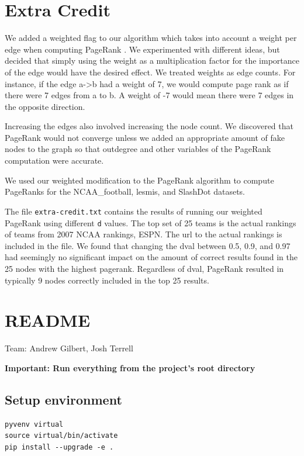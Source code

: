 \documentclass{report}
\newcommand{\pagerank}{PageRank }
\newcommand{\pageranks}{PageRanks }
\begin{document}
\section{Extra Credit}
We added a weighted flag to our algorithm which takes into account a weight per
edge when computing \pagerank. We experimented with different ideas, but decided
that simply using the weight as a multiplication factor for the importance of
the edge would have the desired effect. We treated weights as edge counts.  For
instance, if the edge a->b had a weight of 7, we would compute page rank as if
there were 7 edges from a to b. A weight of -7 would mean there were 7 edges in
the opposite direction.

Increasing the edges also involved increasing the node count. We discovered that
\pagerank would not converge unless we added an appropriate amount of fake nodes
to the graph so that outdegree and other variables of the \pagerank computation
were accurate.

We used our weighted modification to the \pagerank algorithm to compute \pageranks
for the NCAA\_football, lesmis, and SlashDot datasets.

The file \texttt{extra-credit.txt} contains the results of running our weighted
\pagerank using different \texttt{d} values. The top set of 25 teams is the
actual rankings of teams from 2007 NCAA rankings, ESPN. The url to the actual
rankings is included in the file. We found that changing the dval between 0.5,
0.9, and 0.97 had seemingly no significant impact on the amount of correct
results found in the 25 nodes with the highest pagerank. Regardless of dval,
\pagerank resulted in typically 9 nodes correctly included in the top 25
results.


\appendix

\section{README}
\lstset{language=bash}
Team: Andrew Gilbert, Josh Terrell

\textbf{Important: Run everything from the project's root directory}

\subsection{Setup environment}
\begin{lstlisting}
pyvenv virtual
source virtual/bin/activate
pip install --upgrade -e .
\end{lstlisting}
\end{document}
